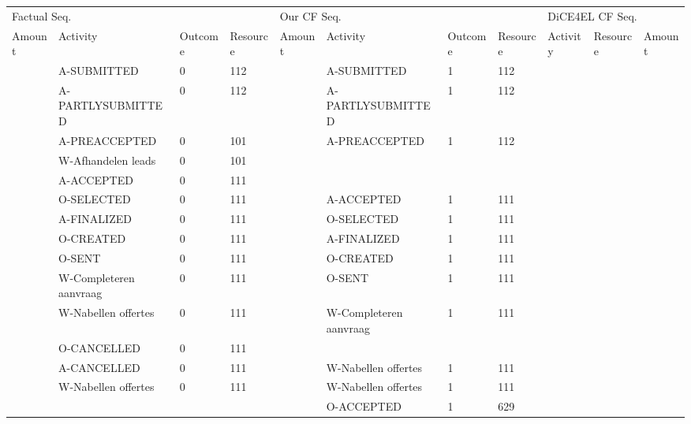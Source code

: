 \begin{tabular}{lllllllllll}
\toprule
\multicolumn{4}{l}{Factual Seq.} & \multicolumn{4}{l}{Our CF Seq.} & \multicolumn{3}{l}{DiCE4EL CF Seq.} \\
Amount & Activity & Outcome & Resource & Amount & Activity & Outcome & Resource & Activity & Resource & Amount \\
\midrule
 & A-SUBMITTED & 0 & 112 &  & A-SUBMITTED & 1 & 112 &  &  &  \\
 & A-PARTLYSUBMITTED & 0 & 112 &  & A-PARTLYSUBMITTED & 1 & 112 &  &  &  \\
 & A-PREACCEPTED & 0 & 101 &  & A-PREACCEPTED & 1 & 112 &  &  &  \\
 & W-Afhandelen leads & 0 & 101 &  &  &  &  &  &  &  \\
 & A-ACCEPTED & 0 & 111 &  &  &  &  &  &  &  \\
 & O-SELECTED & 0 & 111 &  & A-ACCEPTED & 1 & 111 &  &  &  \\
 & A-FINALIZED & 0 & 111 &  & O-SELECTED & 1 & 111 &  &  &  \\
 & O-CREATED & 0 & 111 &  & A-FINALIZED & 1 & 111 &  &  &  \\
 & O-SENT & 0 & 111 &  & O-CREATED & 1 & 111 &  &  &  \\
 & W-Completeren aanvraag & 0 & 111 &  & O-SENT & 1 & 111 &  &  &  \\
 & W-Nabellen offertes & 0 & 111 &  & W-Completeren aanvraag & 1 & 111 &  &  &  \\
 & O-CANCELLED & 0 & 111 &  &  &  &  &  &  &  \\
 & A-CANCELLED & 0 & 111 &  & W-Nabellen offertes & 1 & 111 &  &  &  \\
 & W-Nabellen offertes & 0 & 111 &  & W-Nabellen offertes & 1 & 111 &  &  &  \\
 &  &  &  &  & O-ACCEPTED & 1 & 629 &  &  &  \\
\bottomrule
\end{tabular}
